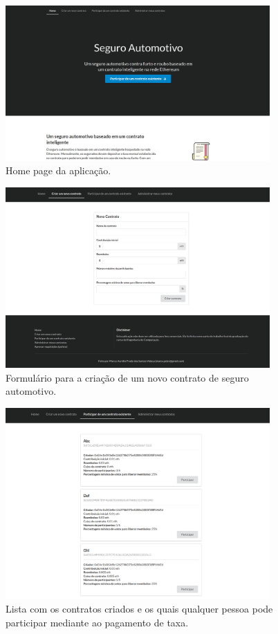 \begin{figure}[h!]
\centering
\includegraphics[width=0.9\textwidth]{Cap2/home_page.png}
\caption{Home page da aplicação.}
\label{home_page}
\end{figure}

\begin{figure}[h!]
\centering
\includegraphics[width=0.9\textwidth]{Cap2/new_contract.png}
\caption{Formulário para a criação de um novo contrato de seguro automotivo.}
\label{new_contract}
\end{figure}

\begin{figure}[h!]
\centering
\includegraphics[width=0.9\textwidth]{Cap2/participate_existent_contract.png}
\caption{Lista com os contratos criados e os quais qualquer pessoa pode participar mediante ao pagamento de taxa.}
\label{participate_existent_contract}
\end{figure}

